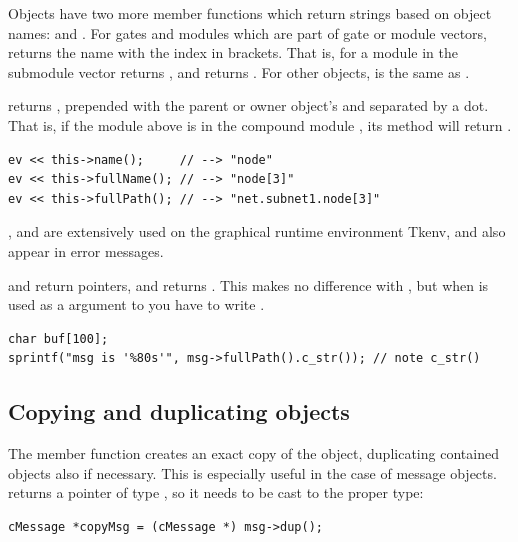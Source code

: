 Objects have two more member functions which return strings
based on object names:  and .
For gates and modules which are part of gate or module vectors,
 returns the name with the index in brackets.
That is, for a module  in the submodule vector 
 returns , and  returns .
For other objects,  is the same as .

 returns , prepended with the
parent or owner object's  and separated by a dot.
That is, if the  module above is in the compound module
, its  method will return
.

\begin{verbatim}
ev << this->name();     // --> "node"
ev << this->fullName(); // --> "node[3]"
ev << this->fullPath(); // --> "net.subnet1.node[3]"
\end{verbatim}

,  and 
are extensively used on the graphical runtime environment Tkenv,
and also appear in error messages.

 and  return  pointers,
and  returns . This makes no difference
with , but when  is used as a  argument
to  you have to write .

\begin{verbatim}
char buf[100];
sprintf("msg is '%80s'", msg->fullPath().c_str()); // note c_str()
\end{verbatim}


\subsection{Copying and duplicating objects}


The  member function creates an exact copy of the
object, duplicating
contained objects also if necessary. This is especially useful in the
case of message objects.  returns a pointer of type
, so it needs to be cast to the proper type:

\begin{verbatim}
cMessage *copyMsg = (cMessage *) msg->dup();
\end{verbatim}


